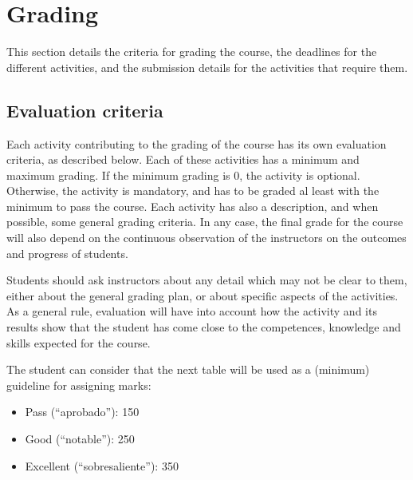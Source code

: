 \documentclass[a4paper]{article}
\begin{document}
\section{Grading}

This section details the criteria for grading the course, the
deadlines for the different activities, and the submission details for
the activities that require them.

\subsection{Evaluation criteria}
\label{sub:evaluation-criteria}

Each activity contributing to the grading of the course has its own
evaluation criteria, as described below. Each of these activities has
a minimum and maximum grading. If the minimum grading is 0, the
activity is optional. Otherwise, the activity is mandatory, and has to
be graded al least with the minimum to pass the course. Each activity
has also a description, and when possible, some general grading
criteria. In any case, the final grade for the course will also depend
on the continuous observation of the instructors on the outcomes and
progress of students.

Students should ask instructors about any detail which may not be
clear to them, either about the general grading plan, or about
specific aspects of the activities. As a general rule, evaluation will
have into account how the activity and its results show that the
student has come close to the competences, knowledge and skills
expected for the course.

The student can consider that the next table will be used as a
(minimum) guideline for assigning marks:

\begin{itemize}
\item Pass (``aprobado''): 150
\item Good (``notable''): 250
\item Excellent (``sobresaliente''): 350
\end{itemize}
\end{document}
